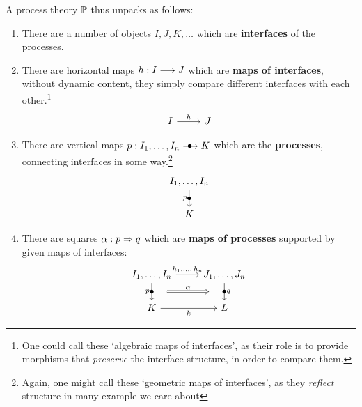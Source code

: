 A process theory $\Processes$ thus unpacks as follows:
\begin{enumerate}
	\item There are a number of objects $I, J, K, \ldots$ which are \textbf{interfaces} of the processes.%
	\item There are horizontal maps $h: I \longrightarrow J$ which are \textbf{maps of interfaces}, without dynamic content, they simply compare different interfaces with each other.\footnote{One could call these `algebraic maps of interfaces', as their role is to provide morphisms that \emph{preserve} the interface structure, in order to compare them.}
	\begin{equation}
		\begin{tikzcd}[ampersand replacement=\&]
			I \& J
			\arrow["h", from=1-1, to=1-2]
		\end{tikzcd}
	\end{equation}
	\item There are vertical maps $p : I_1, \ldots, I_n \verto K$  which are the \textbf{processes}, connecting interfaces in some way.\footnote{Again, one might call these `geometric maps of interfaces', as they \emph{reflect} structure in many example we care about}
	\begin{equation}
		\begin{tikzcd}[ampersand replacement=\&]
			I_1, \ldots, I_n \\
			K
			\arrow["p"', "\bullet"{marking}, from=1-1, to=2-1]
		\end{tikzcd}
	\end{equation}
	\item There are squares $\alpha : p \Rightarrow q$ which are \textbf{maps of processes} supported by given maps of interfaces:
	\begin{equation}
		\begin{tikzcd}[ampersand replacement=\&]
			{I_1, \ldots, I_n} \& {J_1, \ldots, J_n} \\
			K \& L
			\arrow["{h_1, \ldots,\, h_n}", from=1-1, to=1-2]
			\arrow[""{name=0, anchor=center, inner sep=0}, "p"', "\bullet"{marking}, from=1-1, to=2-1]
			\arrow["k"', from=2-1, to=2-2]
			\arrow[""{name=1, anchor=center, inner sep=0}, "q", "\bullet"{marking}, from=1-2, to=2-2]
			\arrow["\alpha", shorten <=15pt, shorten >=15pt, Rightarrow, from=0, to=1]
		\end{tikzcd}
	\end{equation}
\end{enumerate}

